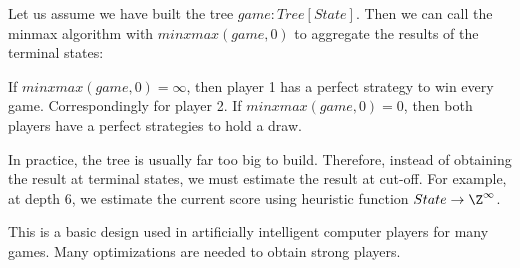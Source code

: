 Let us assume we have built the tree $game:Tree[State]$.
Then we can call the minmax algorithm with $minxmax(game,0)$ to aggregate the results of the terminal states:

\begin{acode}
\end{acode}

If $minxmax(game,0)=\infty$, then player 1 has a perfect strategy to win every game.
Correspondingly for player 2.
If $minxmax(game,0)=0$, then both players have a perfect strategies to hold a draw.

In practice, the tree is usually far too big to build.
Therefore, instead of obtaining the result at terminal states, we must estimate the result at cut-off.
For example, at depth $6$, we estimate the current score using heuristic function $State\to\Z^\infty$.

This is a basic design used in artificially intelligent computer players for many games.
Many optimizations are needed to obtain strong players.

